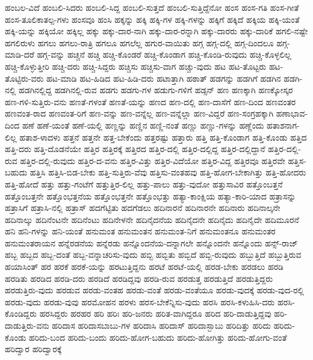 {ಹಂಬಲ-ವಿದೆ
ಹಂಬಲಿ-ಸಿದರು
ಹಂಬಲಿ-ಸಿದ್ದ
ಹಂಬಲಿ-ಸುತ್ತದೆ
ಹಂಬಲಿ-ಸುತ್ತಿದ್ದೆನೋ
ಹಂಸ
ಹಂಸ-ಗತಿ
ಹಂಸ-ಗೀತೆ
ಹಂಸ-ತೂಲಿಕಾತಲ್ಪ-ಗಳು
ಹಂಸವೂ
ಹಂಸಿ
ಹಕ್ಕನ್ನು
ಹಕ್ಕಿ
ಹಕ್ಕಿ-ಗಳ
ಹಕ್ಕಿ-ಗಳನ್ನು
ಹಕ್ಕಿಗೆ
ಹಕ್ಕಿದೆ
ಹಕ್ಕಿಯ
ಹಕ್ಕಿ-ಯಂತೆ
ಹಕ್ಕಿ-ಯನ್ನು
ಹಕ್ಕಿಯೋ
ಹಕ್ಕಿಲ್ಲ
ಹಕ್ಕು
ಹಕ್ಕು-ದಾರ-ನಾಗಿ
ಹಕ್ಕು-ದಾರ-ರನ್ನಾಗಿ
ಹಕ್ಕು-ದಾರರು
ಹಕ್ಕು-ದಾರಿಕೆ
ಹಗಲಿ-ನಷ್ಟೇ
ಹಗಲಿರುಳು
ಹಗಲು
ಹಗಲು-ರಾತ್ರಿ
ಹಗಲೂ
ಹಗಲೆಲ್ಲ
ಹಗುರ-ವಾಯಿತು
ಹಗ್ಗ
ಹಗ್ಗ-ದಲ್ಲಿ
ಹಗ್ಗ-ದಿಂದಲೂ
ಹಗ್ಗ-ಮಾಡಿ-ದರೆ
ಹಗ್ಗ-ವನ್ನು
ಹಚ್ಚನೆ
ಹಚ್ಚಿ
ಹಚ್ಚಿ-ಕೊಂಡರೆ
ಹಚ್ಚಿ-ಕೊಂಡಾಗ
ಹಚ್ಚಿ-ಕೊಂಡಿ-ರುವುದು
ಹಚ್ಚಿ-ಕೊಳ್ಳಲಿಲ್ಲ
ಹಚ್ಚಿ-ಕೊಳ್ಳುತ್ತೀರಿ
ಹಚ್ಚಿ-ದರು
ಹಚ್ಚಿ-ಸಿದ್ದರು
ಹಚ್ಚಿಸು
ಹಚ್ಚಿಸು-ವಾಗ
ಹಚ್ಚು-ವುದು
ಹಟ
ಹಟ-ತೊಟ್ಟರು
ಹಟ-ತೊಟ್ಟಿರು-ವರು
ಹಟ-ಮಾಡಿ
ಹಟ-ಹಿಡಿದ
ಹಟ-ಹಿಡಿ-ದರು
ಹಟಾತ್ತಾಗಿ
ಹಠಾತ್
ಹಡಗನ್ನು
ಹಡಗಿಗೆ
ಹಡಗಿನ
ಹಡಗಿ-ನಲ್ಲಿ
ಹಡಗಿನಲ್ಲಿದ್ದ
ಹಡಗಿನಲ್ಲಿ-ರುವ
ಹಡಗು
ಹಡಗು-ಗಳ
ಹಡುಗು-ಗಳಿಗೆ
ಹಡ್ಸನ್
ಹಣ
ಹಣಕ್ಕಾಗಿ
ಹಣಕ್ಕೋಸ್ಕರ
ಹಣ-ಗಳಿ-ಸುತ್ತಿರು-ವನು
ಹಣತೆ-ಗಳಂತೆ
ಹಣತೆ-ಯನ್ನು
ಹಣದ
ಹಣ-ದಲ್ಲಿ
ಹಣ-ದಾಸೆಗೆ
ಹಣ-ದಿಂದ
ಹಣವಂತರ
ಹಣವಂತ-ರಾದ
ಹಣವಂತ-ರಿಗೆ
ಹಣ-ವನ್ನು
ಹಣ-ವನ್ನೆಲ್ಲ
ಹಣ-ವನ್ನೆಲ್ಲಾ
ಹಣ-ವಿದ್ದರೆ
ಹಣ-ಸಂಗ್ರಹಕ್ಕಾಗಿ
ಹಣಾಭಾವ-ದಿಂದ
ಹಣೆ
ಹಣೆ-ಯಂತೆ
ಹಣೆ-ಯಲ್ಲಿ
ಹಣ್ಣನ್ನು
ಹಣ್ಣಿನ
ಹಣ್ಣಿ-ನಂತೆ
ಹಣ್ಣು
ಹಣ್ಣು-ಗಳನ್ನು
ಹಣ್ಣೆಂದು
ಹತಾಶನಾಗ-ಲಿಲ್ಲ
ಹತಾಶ-ಳಾದಳು
ಹತ್ತನೆ
ಹತ್ತನೇ
ಹತ್ತ-ಬೇಕೆಂದು
ಹತ್ತರಷ್ಟು
ಹತ್ತಾರು
ಹತ್ತಿ
ಹತ್ತಿ-ಕೊಂಡಾಗ
ಹತ್ತಿ-ಕೊಂಡು
ಹತ್ತಿದ
ಹತ್ತಿ-ದರು
ಹತ್ತಿ-ದೊಡನೆಯೇ
ಹತ್ತಿರ
ಹತ್ತಿರಕ್ಕೆ
ಹತ್ತಿರದ
ಹತ್ತಿರ-ದಲ್ಲಿ
ಹತ್ತಿರ-ದಲ್ಲಿದ್ದ
ಹತ್ತಿರ-ದಲ್ಲಿದ್ದಾನೆ
ಹತ್ತಿರ-ದಲ್ಲಿ-ರುವ
ಹತ್ತಿರ-ದಲ್ಲಿ-ರುವುದು
ಹತ್ತಿರ-ದ-ವನು
ಹತ್ತಿರ-ವಿತ್ತು
ಹತ್ತಿರ-ವಿದೆಯೋ
ಹತ್ತಿರ-ವಿದ್ದ
ಹತ್ತಿರವೂ
ಹತ್ತಿರವೇ
ಹತ್ತಿಸ-ಬಹುದು
ಹತ್ತಿಸಿ
ಹತ್ತಿಸಿ-ಬಿಡ-ಬೇಕು
ಹತ್ತಿ-ಸುತ್ತಿರು-ವೆವು
ಹತ್ತಿಸು-ವಂತಹವು
ಹತ್ತಿ-ಹೋಗ-ಬೇಕಾಗಿತ್ತು
ಹತ್ತಿ-ಹೋದರು
ಹತ್ತಿ-ಹೋದೆ
ಹತ್ತು
ಹತ್ತು-ಗಂಟೆಗೆ
ಹತ್ತುತ್ತಿರ-ಲಿಲ್ಲ
ಹತ್ತು-ಪಾಲು
ಹತ್ತು-ವುದೋ
ಹತ್ತುಸಾವಿರ
ಹತ್ತೊಂಬತ್ತನೆ
ಹತ್ತೊಂಬತ್ತನೇ
ಹತ್ತೊಂಭತ್ತನೆಯ
ಹತ್ತೊಂಭತ್ತನೇ
ಹತ್ತೊಂಭತ್ತು
ಹತ್ಯಾ-ಕಾಂಕ್ಷಿಯ
ಹತ್ಯಾ-ಕಾರಿ-ಯಾದ
ಹತ್ರಾಸನ್ನು
ಹತ್ರಾಸಿಗೆ
ಹತ್ರಾಸಿ-ನಲ್ಲಿ
ಹತ್ರಾಸ್
ಹದಗೆಟ್ಟಿತು
ಹದಗೆಡಲು
ಹದಿನಾರನೆ
ಹದಿನಾರನೇ
ಹದಿನಾರು
ಹದಿನಾಲ್ಕನೇ
ಹದಿನಾಲ್ಕು
ಹದಿನೆಂಟನೇ
ಹದಿನೆಂಟು
ಹದಿನೇಳನೇ
ಹದಿನೈದನೆಯ
ಹದಿನೈದನೇ
ಹದಿನೈದು
ಹದಿನೈದೇ
ಹದಿಮೂರನೆ
ಹನಿ
ಹನಿ-ಗಳನ್ನು
ಹನಿ-ಯಂತೆ
ಹನುಮಂತ
ಹನುಮಂತನ
ಹನುಮಂತ-ನಿಗೆ
ಹನುಮಂತನೂ
ಹನುಮಂತರ
ಹನುಮಂತರಾಯನ
ಹನ್ನೆರಡನೆಯ
ಹನ್ನೆರಡು
ಹನ್ನೊಂದನೆಯ-ದನ್ನಾಗಲೇ
ಹನ್ನೊಂದನೇ
ಹನ್ನೊಂದು
ಹನ್ಸ್-ರಾಜ್
ಹಬ್ಬ
ಹಬ್ಬದ
ಹಬ್ಬ-ದಂತೆ
ಹಬ್ಬ-ವನ್ನಾಚರಿಸು-ವುದು
ಹಬ್ಬಿ
ಹಬ್ಬಿತು
ಹಬ್ಬಿದೆ
ಹಬ್ಬಿ-ರುವುದು
ಹಬ್ಬುತ್ತಿದೆ
ಹಬ್ಬುತ್ತಿರುವ
ಹಯಾಸಿಂತ್
ಹರ
ಹರಕೆ
ಹರಕೆ-ಯನ್ನು
ಹರಟುತ್ತಿದ್ದನು
ಹರಟೆ
ಹರಟೆ-ಯಲ್ಲಿ
ಹರಡ-ಬೇಕು
ಹರಡಲು
ಹರಡಿ
ಹರಡಿತು
ಹರಡಿದ
ಹರಡಿ-ದರು
ಹರಡಿದೆ
ಹರಡಿದ್ದವು
ಹರಡಿ-ರುವ
ಹರಡುತ್ತ
ಹರಡುತ್ತಿದೆ
ಹರಡುತ್ತಿದ್ದರು
ಹರಡುತ್ತಿರು-ವುದು
ಹರಡುವ
ಹರಡು-ವಂತಹ
ಹರಡು-ವಂತೆ
ಹರಡು-ವಂತೆಯೂ
ಹರಡು-ವುದಕ್ಕೆ
ಹರಡು-ವುದ-ರಲ್ಲಿ
ಹರಡು-ವುದು
ಹರಡು-ವುವು
ಹರಮೋಹನ
ಹರಳು
ಹರಸ-ಬೇಕೆನ್ನಿಸು-ವುದು
ಹರಸಿ
ಹರಸಿ-ಕಳುಹಿಸಿ-ದರು
ಹರಸಿ-ಕೊಂಡಿದ್ದರು
ಹರಸಿದ್ದರು
ಹರಹರ
ಹರಿ
ಹರಿಃ
ಹರಿ-ಜನರು
ಹರಿತ-ವಾಗಿದ್ದರೂ
ಹರಿದ
ಹರಿ-ದಾಡುತ್ತಿದ್ದವು
ಹರಿ-ದಾಡುತ್ತಿರು-ವನು
ಹರಿದಾಸ
ಹರಿದಾಸಬಾಬು-ಗಳ
ಹರಿದಾಸಿ
ಹರಿದಾಸ್
ಹರಿದಾಸ್ಬಾಬು
ಹರಿದಿತ್ತು
ಹರಿದು
ಹರಿದು-ಕೊಂಡು
ಹರಿದು-ಬಂದ
ಹರಿದು-ಬಂದು
ಹರಿದು-ಹೋಗ-ಬಹುದು
ಹರಿದು-ಹೋಗಿತ್ತು
ಹರಿದು-ಹೋಗು-ವಂತೆ
ಹರಿದ್ವಾರ
ಹರಿದ್ವಾರಕ್ಕೆ
}
